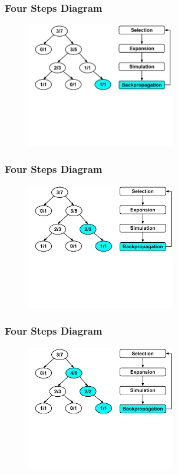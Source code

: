 \documentclass{beamer}
\begin{document}
\begin{frame}[fragile]
\frametitle{Four Steps Diagram}
\begin{figure}[h]
	\includegraphics[width=6.5cm]{Diagrams/MCTSShort/MCTSShortTwoFourOne.pdf}
	\centering
\end{figure}
\end{frame}

\begin{frame}[fragile]
\frametitle{Four Steps Diagram}
\begin{figure}[h]
	\includegraphics[width=6.5cm]{Diagrams/MCTSShort/MCTSShortTwoFourTwo.pdf}
	\centering
\end{figure}
\end{frame}

\begin{frame}[fragile]
\frametitle{Four Steps Diagram}
\begin{figure}[h]
	\includegraphics[width=6.5cm]{Diagrams/MCTSShort/MCTSShortTwoFourThree.pdf}
	\centering
\end{figure}
\end{frame}
\end{document}
